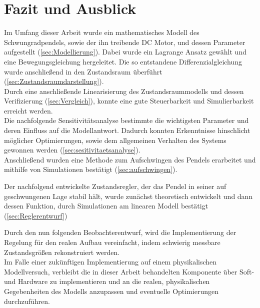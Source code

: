 \pagestyle{milan}
\section{Fazit und Ausblick} \label{sec:ausblick}
Im Umfang dieser Arbeit wurde ein mathematisches Modell des Schwungradpendels, sowie der ihn treibende DC Motor, und dessen Parameter aufgestellt (\ref{sec:Modellierung}). 
Dabei wurde ein Lagrange Ansatz gewählt und eine Bewegungsgleichung hergeleitet. 
Die so entstandene Differenzialgleichung wurde anschließend in den Zustandsraum überführt (\ref{sec:Zustandsraumdarstellung}).\\

Durch eine anschließende Linearisierung des Zustandsraummodells und dessen Verifizierung (\ref{sec:Vergleich}), konnte eine gute Steuerbarkeit und Simulierbarkeit erreicht werden.\\

Die nachfolgende Sensitivitätsanalyse bestimmte die wichtigsten Parameter und deren Einfluss auf die Modellantwort. 
Dadurch konnten Erkenntnisse hinschlicht möglicher Optimierungen, sowie dem allgemeinen Verhalten des Systems gewonnen werden (\ref{sec:sesitivitaetsanalyse}).\\

Anschließend wurden eine Methode zum Aufschwingen des Pendels erarbeitet und mithilfe von Simulationen bestätigt (\ref{sec:aufschwingen}).

Der nachfolgend entwickelte Zustandsregler, der das Pendel in seiner auf geschwungenen Lage stabil hält, wurde zunächst theoretisch entwickelt und dann dessen Funktion, durch Simulationen am linearen Modell bestätigt (\ref{sec:Reglerentwurf})

Durch den nun folgenden Beobachterentwurf, wird die Implementierung der Regelung für den realen Aufbau vereinfacht, indem schwierig messbare Zustandsgrößen rekonstruiert werden.\\

Im Falle einer zukünftigen Implementierung auf einem physikalischen Modellversuch, verbleibt die in dieser Arbeit behandelten Komponente über Soft- und Hardware zu implementieren und an die realen, physikalischen Gegebenheiten des Modells anzupassen und eventuelle Optimierungen durchzuführen. 




